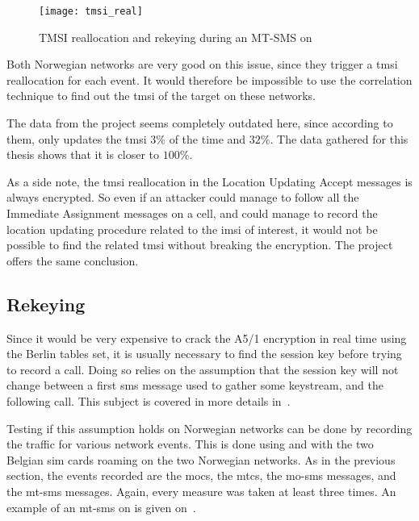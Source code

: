       \begin{figure}
        \centering
        \texttt{[image: tmsi\_real]}
        \caption{TMSI reallocation and rekeying during an MT-SMS on }
        \label{fig:tmsi_real}
      \end{figure}

      Both Norwegian networks are very good on this issue, since they
      trigger a \gls{tmsi} reallocation for each event. It would
      therefore be impossible to use the correlation technique to find
      out the \gls{tmsi} of the target on these networks.

      The data from the  project seems completely outdated
      here, since according to them,  only updates the
      \gls{tmsi} $3\%$ of the time and  $32\%$. The data
      gathered for this thesis shows that it is closer to $100\%$.

      As a side note, the \gls{tmsi} reallocation in the Location
      Updating Accept messages is always encrypted. So even if an
      attacker could manage to follow all the Immediate Assignment
      messages on a cell, and could manage to record the location
      updating procedure related to the \gls{imsi} of interest, it would
      not be possible to find the related \gls{tmsi} without breaking
      the encryption. The  project offers the same
      conclusion.

    \subsection{Rekeying}

      Since it would be very expensive to crack the A5/1 encryption in
      real time using the Berlin tables set, it is usually necessary to
      find the session key before trying to record a call. Doing so
      relies on the assumption that the session key will not change
      between a first \gls{sms} message used to gather some keystream,
      and the following call. This subject is covered in more details
      in~.

      Testing if this assumption holds on Norwegian networks can be done
      by recording the traffic for various network events. This is done
      using  and  with the two Belgian
      \gls{sim} cards roaming on the two Norwegian networks. As in the
      previous section, the events recorded are the \glspl{moc}, the
      \glspl{mtc}, the \gls{mo-sms} messages, and the \gls{mt-sms}
      messages. Again, every measure was taken at least three times. An
      example of an \gls{mt-sms} on  is given
      on~.

